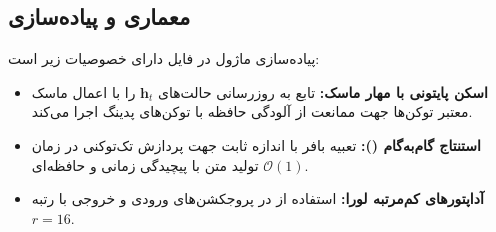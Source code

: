 \subsection{معماری و پیاده‌سازی}
پیاده‌سازی ماژول در فایل  دارای خصوصیات زیر است:
\begin{itemize}
    \item \textbf{اسکن پایتونی با مهار ماسک:} تابع  به روزرسانی حالت‌های $\mathbf{h}_t$ را با اعمال ماسک معتبر توکن‌ها جهت ممانعت از آلودگی حافظه با توکن‌های پدینگ اجرا می‌کند.
    \item \textbf{استنتاج گام‌به‌گام ():} تعبیه بافر با اندازه ثابت جهت پردازش تک‌توکنی در زمان تولید متن با پیچیدگی زمانی و حافظه‌ای $\mathcal{O}(1)$.
    \item \textbf{آداپتورهای کم‌مرتبه لورا:} استفاده از  در پروجکشن‌های ورودی و خروجی با رتبه $r=16$.
\end{itemize}
